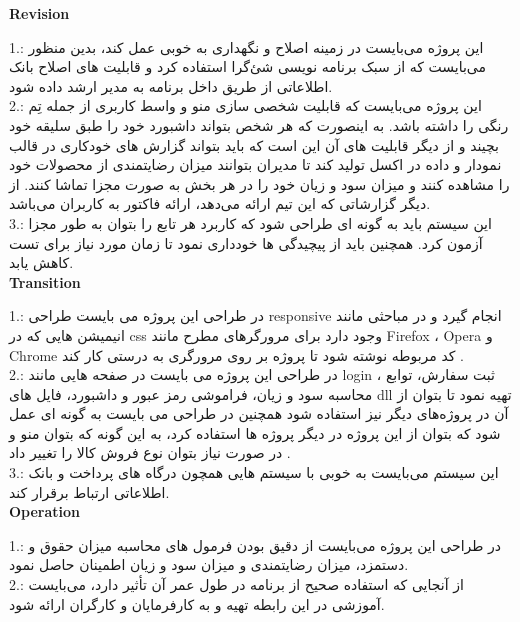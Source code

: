 \documentclass[a4paper, 12pt]{report}
\begin{document}
	\textbf{Revision}
	
	1.: این پروژه می‌بایست در زمینه اصلاح و نگهداری به خوبی عمل کند، بدین منظور می‌بایست که از سبک برنامه نویسی شئ‌گرا استفاده کرد و قابلیت های اصلاح بانک اطلاعاتی از طریق داخل برنامه به مدیر ارشد داده شود.\\
	
	2.: این پروژه می‌بایست که قابلیت شخصی سازی منو و واسط کاربری از جمله تِم رنگی را داشته باشد. به اینصورت که هر شخص بتواند داشبورد خود را طبق سلیقه خود بچیند و از دیگر قابلیت های آن این است که باید بتواند گزارش های خودکاری در قالب نمودار و داده در اکسل تولید کند تا مدیران بتوانند میزان رضایتمندی از محصولات خود را مشاهده کنند و میزان سود و زیان خود را در هر بخش به صورت مجزا تماشا کنند. از دیگر گزارشاتی که این تیم ارائه می‌دهد، ارائه فاکتور به کاربران می‌باشد.\\
	
	3.: این سیستم باید به گونه ای طراحی شود که کاربرد هر تابع را بتوان به طور مجزا آزمون کرد. همچنین باید از پیچیدگی ها خودداری نمود تا زمان مورد نیاز برای تست کاهش یابد.\\
	
	\textbf{Transition} 
	
	1.: در طراحی این پروژه می بایست طراحی responsive انجام گیرد و در مباحثی مانند انیمیشن هایی که در css وجود دارد برای مرورگرهای مطرح مانند Firefox ، Opera و Chrome کد مربوطه نوشته شود تا پروژه بر روی مرورگری به درستی کار کند .\\
	
	2.: در طراحی این پروژه می بایست در صفحه هایی مانند login ، ثبت سفارش، توابع محاسبه سود و زیان، فراموشی رمز عبور و داشبورد، فایل های dll تهیه نمود تا بتوان از آن در پروژه‌های دیگر نیز استفاده شود همچنین در طراحی می بایست به گونه ای عمل شود که بتوان از این پروژه در دیگر پروژه ها استفاده کرد، به این گونه که بتوان منو و در صورت نیاز بتوان نوع فروش کالا را تغییر داد .\\
	
	3.: این سیستم می‌بایست به خوبی با سیستم هایی همچون درگاه های پرداخت و بانک اطلاعاتی ارتباط برقرار کند.\\
	
	\textbf{Operation}
	
	1.: در طراحی این پروژه می‌بایست از دقیق بودن فرمول های محاسبه میزان حقوق و دستمزد، میزان رضایتمندی و میزان سود و زیان اطمینان حاصل نمود.\\
	
	2.: از آنجایی که استفاده صحیح از برنامه در طول عمر آن تأثیر دارد، می‌بایست آموزشی در این رابطه تهیه و به کارفرمایان و کارگران ارائه شود.\\
	
\end{document}
